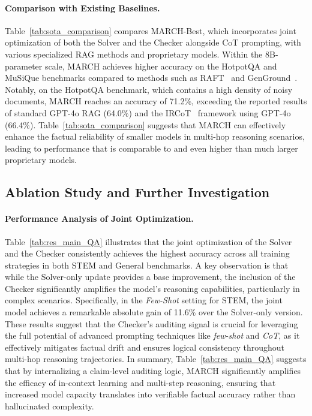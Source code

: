 \documentclass[10pt, a4paper, logo]{googledeepmind} %
\begin{document}
\paragraph{Comparison with Existing Baselines.}
Table~\ref{tab:sota_comparison} compares MARCH-Best, which incorporates joint optimization of both the {Solver} and the {Checker} alongside CoT prompting, with various specialized RAG methods and proprietary models. Within the 8B-parameter scale, MARCH achieves higher accuracy on the HotpotQA and MuSiQue benchmarks compared to methods such as RAFT~\citep{dong2023raftrewardrankedfinetuning} and GenGround~\citep{shi2024generate}. Notably, on the HotpotQA benchmark, which contains a high density of noisy documents, MARCH reaches an accuracy of 71.2\%, exceeding the reported results of standard GPT-4o RAG (64.0\%) and the IRCoT~\citep{trivedi2023interleaving} framework using GPT-4o (66.4\%). 
Table~\ref{tab:sota_comparison} suggests that MARCH can effectively enhance the factual reliability of smaller models in multi-hop reasoning scenarios, leading to performance that is comparable to and even higher than much larger proprietary models.

\subsection{Ablation Study and Further Investigation}
\paragraph{Performance Analysis of Joint Optimization.} Table~\ref{tab:res_main_QA} illustrates that the joint optimization of the {Solver} and the {Checker} consistently achieves the highest accuracy across all training strategies in both STEM and General benchmarks. A key observation is that while the Solver-only update provides a base improvement, the inclusion of the {Checker} significantly amplifies the model's reasoning capabilities, particularly in complex scenarios. Specifically, in the \textit{Few-Shot} setting for STEM, the joint model achieves a remarkable absolute gain of 11.6\% over the {Solver-only} version. These results suggest that the {Checker}'s auditing signal is crucial for leveraging the full potential of advanced prompting techniques like \textit{few-shot} and \textit{CoT}, as it effectively mitigates factual drift and ensures logical consistency throughout multi-hop reasoning trajectories. In summary, Table~\ref{tab:res_main_QA} suggests that by internalizing a claim-level auditing logic, MARCH significantly amplifies the efficacy of in-context learning and multi-step reasoning, ensuring that increased model capacity translates into verifiable factual accuracy rather than hallucinated complexity.
\end{document}

